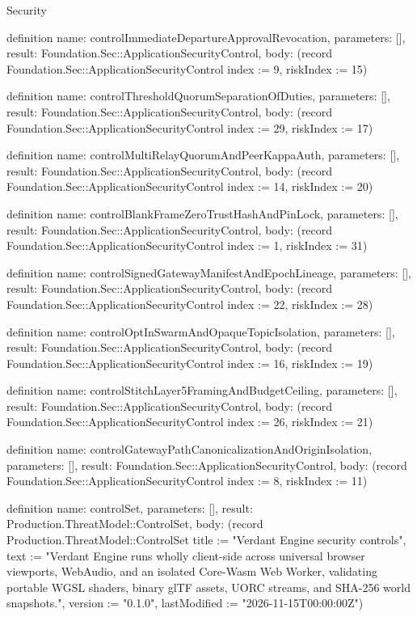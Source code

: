 \begin{lexlean}{Security}
\begin{semanticmodule}
definition{
  name: controlImmediateDepartureApprovalRevocation,
  parameters: [],
  result: Foundation.Sec::ApplicationSecurityControl,
  body: (record Foundation.Sec::ApplicationSecurityControl {index := 9, riskIndex := 15})
}

definition{
  name: controlThresholdQuorumSeparationOfDuties,
  parameters: [],
  result: Foundation.Sec::ApplicationSecurityControl,
  body: (record Foundation.Sec::ApplicationSecurityControl {index := 29, riskIndex := 17})
}

definition{
  name: controlMultiRelayQuorumAndPeerKappaAuth,
  parameters: [],
  result: Foundation.Sec::ApplicationSecurityControl,
  body: (record Foundation.Sec::ApplicationSecurityControl {index := 14, riskIndex := 20})
}

definition{
  name: controlBlankFrameZeroTrustHashAndPinLock,
  parameters: [],
  result: Foundation.Sec::ApplicationSecurityControl,
  body: (record Foundation.Sec::ApplicationSecurityControl {index := 1, riskIndex := 31})
}

definition{
  name: controlSignedGatewayManifestAndEpochLineage,
  parameters: [],
  result: Foundation.Sec::ApplicationSecurityControl,
  body: (record Foundation.Sec::ApplicationSecurityControl {index := 22, riskIndex := 28})
}

definition{
  name: controlOptInSwarmAndOpaqueTopicIsolation,
  parameters: [],
  result: Foundation.Sec::ApplicationSecurityControl,
  body: (record Foundation.Sec::ApplicationSecurityControl {index := 16, riskIndex := 19})
}

definition{
  name: controlStitchLayer5FramingAndBudgetCeiling,
  parameters: [],
  result: Foundation.Sec::ApplicationSecurityControl,
  body: (record Foundation.Sec::ApplicationSecurityControl {index := 26, riskIndex := 21})
}

definition{
  name: controlGatewayPathCanonicalizationAndOriginIsolation,
  parameters: [],
  result: Foundation.Sec::ApplicationSecurityControl,
  body: (record Foundation.Sec::ApplicationSecurityControl {index := 8, riskIndex := 11})
}

definition{
  name: controlSet,
  parameters: [],
  result: Production.ThreatModel::ControlSet,
  body: (record Production.ThreatModel::ControlSet {title := "Verdant Engine security controls", text := "Verdant Engine runs wholly client-side across universal browser viewports, WebAudio, and an isolated Core-Wasm Web Worker, validating portable WGSL shaders, binary glTF assets, UORC streams, and SHA-256 world snapshots.", version := "0.1.0", lastModified := "2026-11-15T00:00:00Z"})
}


\end{semanticmodule}
\end{lexlean}

